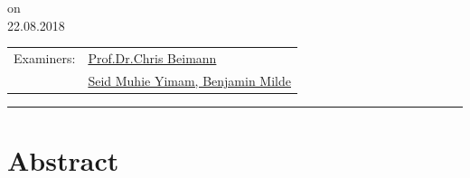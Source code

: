 \documentclass[12pt,final,twoside]{report}
\makeatletter
\newcommand{\trauthor}{Ethem Can Karaoguz}
\newcommand{\trmatrikelnummer}{6641214}
\newcommand{\trgutachterA}{\href{mailto:beimann@informatik.uni-hamburg.de}{Prof.Dr.Chris Beimann}}
\newcommand{\trgutachterB}{\href{mailto:yimam@informatik.uni-hamburg.de, milde@informatik.uni-hamburg.de}{Seid Muhie Yimam, Benjamin Milde}}
\newcommand{\trdate}{22.08.2018}
\theoremstyle{plain}
\theoremstyle{definition}
\theoremstyle{remark}
\makeatother
\begin{document}
\begin{titlepage}
\begin{center}
      on\\
      \trdate
    \end{center}
    \vspace{2cm}
    \begin{center}
    \begin{tabular}{ll}
    Examiners: & \trgutachterA \\
                   & \trgutachterB \\
    \end{tabular}
    \end{center}
    \vfill
    \rule{\textwidth}{0.4pt}
    \newpage 
\end{titlepage}

\thispagestyle{empty}
\hspace{1cm}
\newpage

\section*{Abstract}\label{sec:abstract}
	



\end{document}

